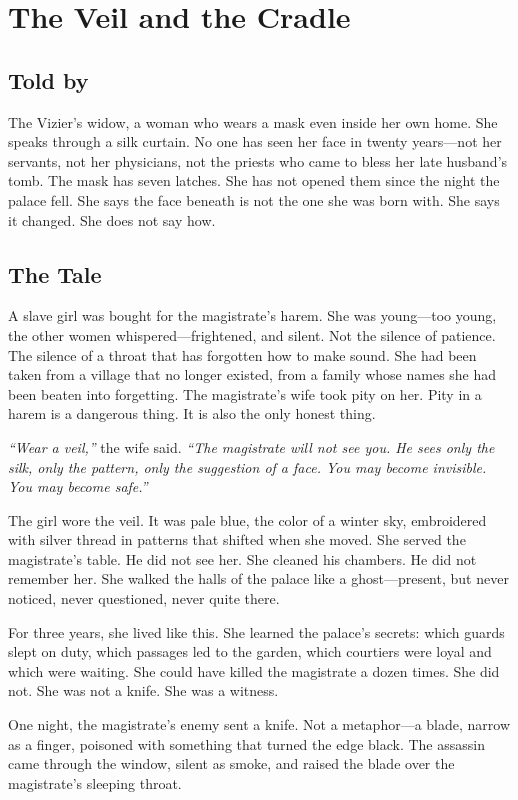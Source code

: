 \chapter{The Veil and the Cradle}

\section*{Told by}
The Vizier's widow, a woman who wears a mask even inside her own home. She speaks through a silk curtain. No one has seen her face in twenty years---not her servants, not her physicians, not the priests who came to bless her late husband's tomb. The mask has seven latches. She has not opened them since the night the palace fell. She says the face beneath is not the one she was born with. She says it changed. She does not say how.

\section*{The Tale}

A slave girl was bought for the magistrate's harem. She was young---too young, the other women whispered---frightened, and silent. Not the silence of patience. The silence of a throat that has forgotten how to make sound. She had been taken from a village that no longer existed, from a family whose names she had been beaten into forgetting. The magistrate's wife took pity on her. Pity in a harem is a dangerous thing. It is also the only honest thing.

\textit{``Wear a veil,''} the wife said. \textit{``The magistrate will not see you. He sees only the silk, only the pattern, only the suggestion of a face. You may become invisible. You may become safe.''}

The girl wore the veil. It was pale blue, the color of a winter sky, embroidered with silver thread in patterns that shifted when she moved. She served the magistrate's table. He did not see her. She cleaned his chambers. He did not remember her. She walked the halls of the palace like a ghost---present, but never noticed, never questioned, never quite there.

For three years, she lived like this. She learned the palace's secrets: which guards slept on duty, which passages led to the garden, which courtiers were loyal and which were waiting. She could have killed the magistrate a dozen times. She did not. She was not a knife. She was a witness.

One night, the magistrate's enemy sent a knife. Not a metaphor---a blade, narrow as a finger, poisoned with something that turned the edge black. The assassin came through the window, silent as smoke, and raised the blade over the magistrate's sleeping throat.

